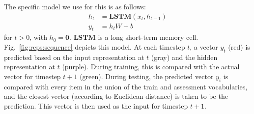 \documentclass[12pt]{article}
\newcommand{\LSTM}{\textbf{LSTM}}
\newcommand{\Figref}[1]{Fig.~\ref{#1}}
\begin{document}
The specific model we use for this is as follows:
%
\begin{align}
  h_{t} &= \LSTM(x_{t}, h_{t-1}) \label{eq:lstm-recur}\\
  y_{t} &= h_{t}W + b\label{eq:lstm-predict}
\end{align}
%
for $t > 0$, with $h_{0} = \mathbf{0}$. $\LSTM$ is a long short-term memory cell. \Figref{fig:reps:sequence} depicts this model. At each timestep $t$, a vector $y_{t}$ (red) is predicted based on the input representation at $t$ (gray) and the hidden representation at $t$ (purple). During training, this is compared with the actual vector for timestep $t+1$ (green). During testing, the predicted vector $y_{i}$ is compared with every item in the union of the train and assessment vocabularies, and the closest vector (according to Euclidean distance) is taken to be the prediction. This vector is then used as the input for timestep $t+1$.
\end{document}
